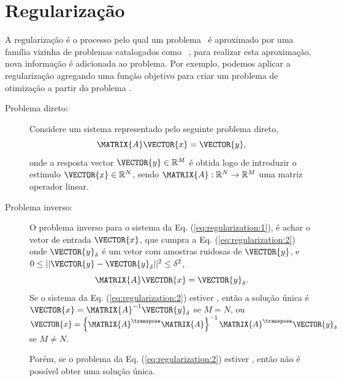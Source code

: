 

\section{Regularização}



A regularização é o processo pelo qual um problema \illposed~é 
aproximado por uma família vizinha de problemas catalogados como \wellposed~\cite[pp. 49]{engl2000regularization},
para realizar esta aproximação, nova informação  é adicionada ao problema.
Por exemplo, podemos aplicar a regularização agregando uma função objetivo para criar um problema de otimização
a partir do problema \illposed.

\begin{description}
\item[Problema direto:] Considere um sistema representado pelo seguinte problema direto,
\begin{equation}\label{eq:regularization:1}
\MATRIX{A}\VECTOR{x}=\VECTOR{y},
\end{equation}
onde a resposta vector $\VECTOR{y}\in \mathbb{R}^M$ é obtida logo de introduzir o estimulo $\VECTOR{x}\in \mathbb{R}^N$,
sendo $\MATRIX{A}:\mathbb{R}^N \rightarrow \mathbb{R}^M$ uma matriz operador linear.

\item[Problema inverso:] O problema inverso para o sistema da Eq. (\ref{eq:regularization:1}), é
achar o vetor de entrada $\VECTOR{x}$, que cumpra  a Eq. (\ref{eq:regularization:2})
onde $\VECTOR{y}_{\delta}$ é um vetor com amostras ruidosas de $\VECTOR{y}$,
e $0\leq||\VECTOR{y}-\VECTOR{y}_{\delta}||^2\leq \delta^2$,
\begin{equation}\label{eq:regularization:2}
\MATRIX{A}\VECTOR{x}=\VECTOR{y}_{\delta}.
\end{equation}
Se o sistema da Eq. (\ref{eq:regularization:2}) estiver \wellposed,
então a solução única é $\VECTOR{x}=\MATRIX{A}^{-1}\VECTOR{y}_{\delta}$ se $M=N$,
ou $\VECTOR{x}=\left\{\MATRIX{A}^{\transpose}\MATRIX{A}\right\}^{-1}\MATRIX{A}^{\transpose}\VECTOR{y}_{\delta}$ se $M\neq N$.

Porém, se o problema da Eq. (\ref{eq:regularization:2}) estiver \illposed,
então não é possível obter uma solução única.\\
\end{description}

